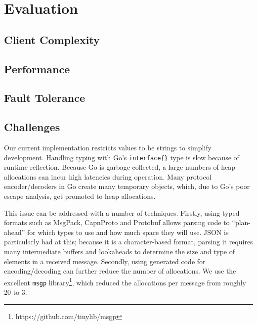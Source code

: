 \section{Evaluation} \label{section:evaluation}

\subsection{Client Complexity}

\subsection{Performance}

\subsection{Fault Tolerance}

\subsection{Challenges}

Our current implementation restricts values to be strings to simplify development. 
Handling typing with Go's \texttt{interface\{\}} type is slow because of runtime reflection.
Because Go is garbage collected, a large numbers of heap allocations can incur high latencies during
operation. Many protocol encoder/decoders in Go create many temporary objects, which, due to Go's poor escape analysis, get promoted to heap allocations. 

This issue can be addressed with a number of techniques. 
Firstly, using typed formats such as MsgPack, CapnProto and Protobuf allows parsing code to ``plan-ahead'' for which types to use and how much space they will use. 
JSON is particularly bad at this; because it is a character-based format, parsing it requires many intermediate buffers and lookaheads to determine the size and type of elements in a received message.
Secondly, using generated code for encoding/decoding can further reduce the number of allocations. We use the excellent \texttt{msgp} library\footnote{https://github.com/tinylib/msgp}, which reduced the allocations per message from roughly 20 to 3.
